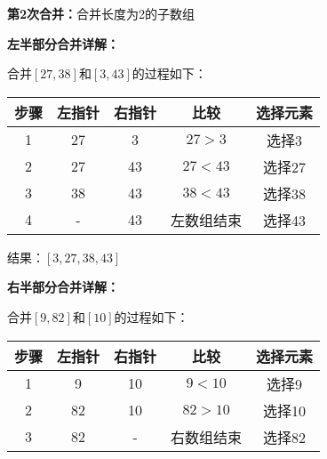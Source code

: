 \documentclass[12pt,a4paper]{amsart}
\begin{document}
\textbf{第2次合并：}合并长度为2的子数组

\begin{center}
\end{center}

\begin{center}
\end{center}

\textbf{左半部分合并详解：}

合并$[27,38]$和$[3,43]$的过程如下：

\begin{center}
\begin{tabular}{|c|c|c|c|c|}
\hline
\textbf{步骤} & \textbf{左指针} & \textbf{右指针} & \textbf{比较} & \textbf{选择元素} \\
\hline
1 & 27 & 3 & $27 > 3$ & 选择3 \\
\hline
2 & 27 & 43 & $27 < 43$ & 选择27 \\
\hline
3 & 38 & 43 & $38 < 43$ & 选择38 \\
\hline
4 & - & 43 & 左数组结束 & 选择43 \\
\hline
\end{tabular}
\end{center}

结果：$[3, 27, 38, 43]$

\textbf{右半部分合并详解：}

合并$[9,82]$和$[10]$的过程如下：

\begin{center}
\begin{tabular}{|c|c|c|c|c|}
\hline
\textbf{步骤} & \textbf{左指针} & \textbf{右指针} & \textbf{比较} & \textbf{选择元素} \\
\hline
1 & 9 & 10 & $9 < 10$ & 选择9 \\
\hline
2 & 82 & 10 & $82 > 10$ & 选择10 \\
\hline
3 & 82 & - & 右数组结束 & 选择82 \\
\hline
\end{tabular}
\end{center}
\end{document}
